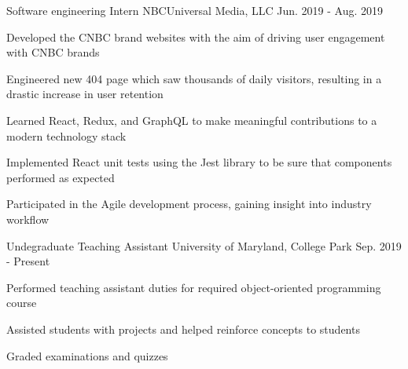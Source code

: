 

\begin{cventries}

  \cventry
    {Software engineering Intern} %
    {NBCUniversal Media, LLC} %
    {} %
    {Jun. 2019 - Aug. 2019} %
    {
      \begin{cvitems} %
        \item {Developed the CNBC brand websites with the aim of driving user engagement with CNBC brands}
        \item {Engineered new 404 page which saw thousands of daily visitors, resulting in a drastic increase in user retention}
        \item {Learned React, Redux, and GraphQL to make meaningful contributions to a modern technology stack}
        \item {Implemented React unit tests using the Jest library to be sure that components performed as expected}
        \item {Participated in the Agile development process, gaining insight into industry workflow}
        \end{cvitems}
    }

\cventry
    {Undegraduate Teaching Assistant} %
    {University of Maryland, College Park} %
    {} %
    {Sep. 2019 - Present} %
    {
      \begin{cvitems} %
        \item {Performed teaching assistant duties for required object-oriented programming course}
        \item {Assisted students with projects and helped reinforce concepts to students}
        \item {Graded examinations and quizzes}
        \end{cvitems}
    }


\end{cventries}
